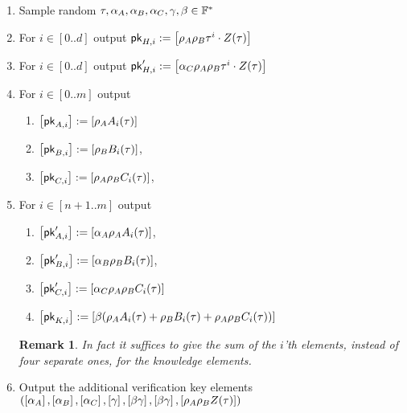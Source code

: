 \documentclass[11pt]{article}
\numberwithin{figure}{section} %
\newtheorem{remark}[thm]{Remark}
\begin{document}
\begin{enumerate}
 \item Sample random $\tau,\alpha_A,\alpha_B,\alpha_C,\gamma,\beta\in \mathbb F^*$
 \item For $i\in [0..d]$ output $\mathsf{pk}_{H,i}:= \left[\rho_A\rho_B \tau^i\cdot Z(\tau)\right]$
\item For $i\in [0..d]$ output $\mathsf{pk}'_{H,i}:= \left[\alpha_C \rho_A\rho_B \tau^i\cdot Z(\tau)\right]$
 \item For $i\in [0..m]$ output
 
 \begin{enumerate}
  \item $\left[\mathsf{pk}_{A,i}\right]:= \left[\rho_A A_i(\tau)\right]$
  
\item $\left[\mathsf{pk}_{B,i}\right]:=\left[\rho_B B_i(\tau)\right]$,
\item $\left[\mathsf{pk}_{C,i}\right]:= \left[\rho_A\rho_B C_i(\tau)\right]$,

\end{enumerate}
 \item For $i\in [n+1..m]$ output
\begin{enumerate}
\item  $\left[\mathsf{pk}'_{A,i}\right]:=\left[\alpha_A\rho_A A_i(\tau)\right]$,
\item $\left[\mathsf{pk}'_{B,i}\right]:= \left[\alpha_B\rho_B B_i(\tau)\right]$,
\item $\left[\mathsf{pk}'_{C,i}\right]:= \left[\alpha_C \rho_A\rho_B C_i(\tau)\right]$
\item $\left[\mathsf{pk}_{K,i}\right]:= \left[\beta(\rho_A A_i(\tau) + \rho_B B_i(\tau) + \rho_A\rho_B C_i(\tau))\right]$ 


\end{enumerate}

\begin{remark}
 In fact it suffices to give the \emph{sum} of the $i$'th elements, instead of four separate ones, for the knowledge elements.
\end{remark}


\item Output the additional verification key elements $(\left[\alpha_A\right],\left[\alpha_B\right],\left[\alpha_C\right],\left[\gamma\right],\left[\beta\gamma\right],\left[\beta\gamma\right],\left[\rho_A\rho_B Z(\tau)\right])$
 \end{enumerate}
\end{document}
